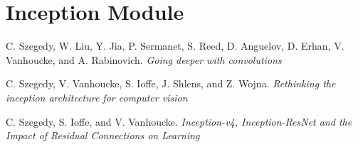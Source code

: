 \documentclass[a4paper,12pt]{report}
\begin{document}
\section{Inception Module}	



\begin{thebibliography}{9}
 C. Szegedy, W. Liu, Y. Jia, P. Sermanet, S. Reed, D. Anguelov, D. Erhan, V. Vanhoucke, and A. Rabinovich. \textit{Going deeper with convolutions}

 C. Szegedy, V. Vanhoucke, S. Ioffe, J. Shlens, and Z. Wojna. \textit{Rethinking the inception architecture for computer vision}

 C. Szegedy, S. Ioffe, and V. Vanhoucke. \textit{Inception-v4, Inception-ResNet and the Impact of Residual Connections on Learning}

\end{thebibliography}
\end{document}
